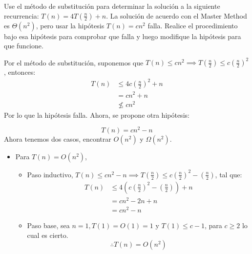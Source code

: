 




\begin{problema}
    Use el método de substitución para determinar la solución a la siguiente recurrencia: $T(n)=4 T\left(\frac{n}{2}\right)+n$. La solución de acuerdo con el Master Method es $\Theta\left(n^2\right)$, pero usar la hipótesis $T(n)=c n^2$ falla. Realice el procedimiento bajo esa hipótesis para comprobar que falla y luego modifique la hipótesis para que funcione.
    \begin{sol}
        Por el método de substitución, suponemos que $T(n)\leq c n^2\implies T\left(\frac{n}{2}\right)\leq c\left(\frac{n}{2}\right) ^2 $, entonces: 
        \begin{align*}
            T(n)&\leq 4c\left(\frac{n}{2}\right) ^2+n\\
                &= cn^2+n\\
                &\not\leq cn^2
        \end{align*}
        Por lo que la hipótesis falla. Ahora, se propone otra hipótesis:

        $$T(n)= cn^2-n$$
        Ahora tenemos dos casos, encontrar $O(n^2)$ y $\Omega(n^2)$.
        \begin{itemize}
            \item Para $T(n)=O(n^2)$,
             \begin{itemize}
                \item Paso inductivo, $T(n)\leq cn^2-n \implies T\left(\frac{n}{2}\right)\leq c\left(\frac{n}{2}\right)^2-\left(\frac{n}{2}\right)$, tal que: 
                \begin{align*}
                    T(n)&\leq 4\left( c\left(\frac{n}{2}\right)^2-\left(\frac{n}{2}\right)\right)+n\\
                        &= cn^2 -2n+n\\
                        &= cn^2-n
                \end{align*}
                \item Paso base, sea $n=1, T(1)=O(1)=1$ y $T(1)\leq c-1$, para $c\geq 2$ lo cual es cierto.
                $$\therefore T(n)=O(n^2)$$
            

\end{itemize}
\end{itemize}
\end{sol}
\end{problema}
